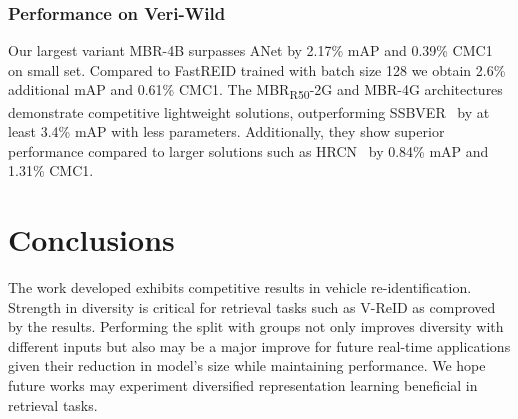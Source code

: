 \documentclass[letterpaper, 10pt, conference]{ieeeconf}
\begin{document}
\subsubsection{Performance on Veri-Wild} 
Our largest variant MBR-4B surpasses ANet \cite{quispe2021attributenet} by 2.17\% mAP and 0.39\% CMC1 on small set. Compared to FastREID \cite{he2020fastreid} trained with batch size 128 we obtain 2.6\% additional mAP and 0.61\% CMC1. 
The MBR\textsubscript{R50}-2G and MBR-4G architectures demonstrate competitive lightweight solutions, outperforming SSBVER~\cite{khorramshahi2022scalable} by at least 3.4\% mAP with less parameters. Additionally, they show superior performance compared to larger solutions such as HRCN~\cite{zhao2021heterogeneous} by 0.84\% mAP and 1.31\% CMC1.





\section{Conclusions}
The work developed exhibits competitive results in vehicle re-identification. Strength in diversity is critical for retrieval tasks such as V-ReID as comproved by the results. Performing the split with groups not only improves diversity with different inputs but also may be a major improve for future real-time applications given their reduction in model's size while maintaining performance. We hope future works may experiment diversified representation learning beneficial in retrieval tasks. 





\end{document}
